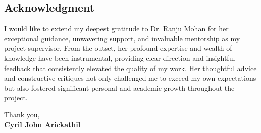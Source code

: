 
\begin{titlepage}
    \begin{flushright}
        
  
\section*{Acknowledgment}
\justifying
I would like to extend my deepest gratitude to Dr. Ranju Mohan for her exceptional guidance, unwavering support, and invaluable mentorship as my project supervisor. From the outset, her profound expertise and wealth of knowledge have been instrumental, providing clear direction and insightful feedback that consistently elevated the quality of my work. Her thoughtful advice and constructive critiques not only challenged me to exceed my own expectations but also fostered significant personal and academic growth throughout the project.
\vspace*{3\baselineskip}


Thank you, \\

{\large  \bfseries Cyril John Arickathil }


\end{flushright}

\end{titlepage}
